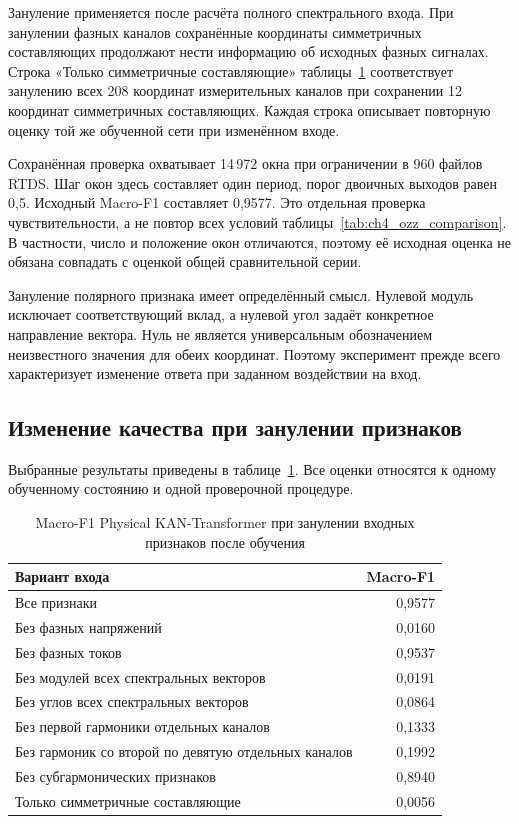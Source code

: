 Зануление применяется после расчёта полного спектрального входа. При занулении фазных
каналов сохранённые координаты симметричных составляющих продолжают нести информацию об
исходных фазных сигналах. Строка «Только симметричные составляющие»
таблицы~\ref{tab:ch4_input_sensitivity} соответствует занулению всех 208 координат
измерительных каналов при сохранении 12 координат симметричных составляющих. Каждая
строка описывает повторную оценку той же обученной сети при изменённом входе.

Сохранённая проверка охватывает 14\,972 окна
при ограничении в 960 файлов RTDS.
Шаг окон здесь составляет один период,
порог двоичных выходов равен 0,5.
Исходный Macro-F1 составляет 0,9577.
Это отдельная проверка чувствительности,
а не повтор всех условий таблицы~\ref{tab:ch4_ozz_comparison}.
В частности, число и положение окон отличаются,
поэтому её исходная оценка не обязана совпадать
с оценкой общей сравнительной серии.

Зануление полярного признака имеет определённый смысл.
Нулевой модуль исключает соответствующий вклад,
а нулевой угол задаёт конкретное направление вектора.
Нуль не является универсальным обозначением
неизвестного значения для обеих координат.
Поэтому эксперимент прежде всего характеризует
изменение ответа при заданном воздействии на вход.

\subsection{Изменение качества при занулении признаков}
\label{sec:ch4_input_sensitivity_results}


Выбранные результаты приведены
в таблице~\ref{tab:ch4_input_sensitivity}.
Все оценки относятся к одному обученному состоянию
и одной проверочной процедуре.

\begin{table}[htbp]
 \centering
 \small
 \caption{Macro-F1 Physical KAN-Transformer при занулении входных признаков после обучения}
 \label{tab:ch4_input_sensitivity}
 \begin{tabular}{p{9.4cm}r}
  \hline
  Вариант входа & Macro-F1 \\
  \hline
  Все признаки & 0,9577 \\
  Без фазных напряжений & 0,0160 \\
  Без фазных токов & 0,9537 \\
  Без модулей всех спектральных векторов & 0,0191 \\
  Без углов всех спектральных векторов & 0,0864 \\
  Без первой гармоники отдельных каналов & 0,1333 \\
  Без гармоник со второй по девятую отдельных каналов & 0,1992 \\
  Без субгармонических признаков & 0,8940 \\
  Только симметричные составляющие & 0,0056 \\
  \hline
 \end{tabular}
\end{table}

